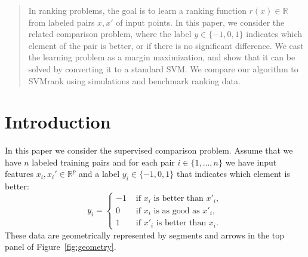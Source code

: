 \documentclass{article}
\newcommand{\RR}{\mathbb R}
\begin{document}
\renewcommand{\arraystretch}{1.5}



\begin{abstract}
  In ranking problems, the goal is to learn a ranking function
  $r(x)\in\RR$ from labeled pairs $x,x'$ of input points. In this
  paper, we consider the related comparison problem, where the label
  $y\in\{-1,0,1\}$ indicates which element of the pair is better, or
  if there is no significant difference. We cast the learning problem
  as a margin maximization, and show that it can be solved by
  converting it to a standard SVM. We compare our algorithm to SVMrank
  using simulations and benchmark ranking data.
\end{abstract}

\section{Introduction}

In this paper we consider the supervised comparison problem. Assume
that we have $n$ labeled training pairs and for each pair
$i\in\{1,\dots,n\}$ we have input features $x_i,x_i'\in\RR^p$ and a
label $y_i\in\{-1,0,1\}$ that indicates which element is better:
\begin{equation}
  \label{eq:z}
  y_i =
  \begin{cases}
    -1 & \text{ if $x_i$ is better than $x'_i$},\\
    0 & \text{ if $x_i$ is as good as $x'_i$},\\
    1 & \text{ if $x'_i$ is better than $x_i$}.
  \end{cases}
\end{equation}
These data are geometrically represented by segments and arrows in the
top panel of Figure~\ref{fig:geometry}. 
\end{document}
